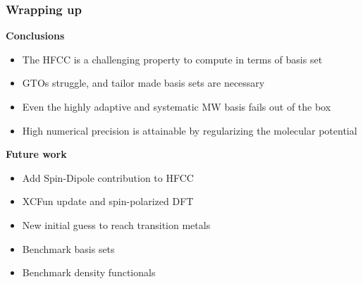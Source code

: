 \begin{frame}
\frametitle{Wrapping up}
\scriptsize
\textbf{Conclusions}
\begin{itemize}
\item The HFCC is a challenging property to compute in terms of basis set
\item GTOs struggle, and tailor made basis sets are necessary
\item Even the highly adaptive and systematic MW basis fails out of the box
\item High numerical precision is attainable by regularizing the molecular potential
\end{itemize}

\vspace{5mm}

\pause
\textbf{Future work}
\begin{itemize}
\item Add Spin-Dipole contribution to HFCC
\item XCFun update and spin-polarized DFT
\item New initial guess to reach transition metals
\item Benchmark basis sets
\item Benchmark density functionals
\end{itemize}
\end{frame}

